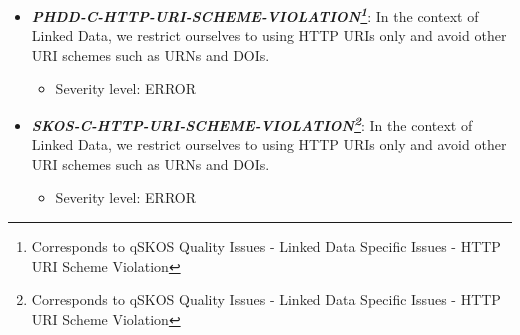 \documentclass{llncs}
\begin{document}
\begin{itemize}
	\item \textbf{\em PHDD-C-HTTP-URI-SCHEME-VIOLATION\footnote{Corresponds to qSKOS Quality Issues - Linked Data Specific Issues - HTTP URI Scheme Violation}}: 
	In the context of Linked Data, we restrict ourselves to using HTTP URIs only and avoid other URI schemes such as URNs and DOIs.
	\begin{itemize}
		\item Severity level: ERROR
	\end{itemize}
\end{itemize}

\begin{itemize}
	\item \textbf{\em SKOS-C-HTTP-URI-SCHEME-VIOLATION\footnote{Corresponds to qSKOS Quality Issues - Linked Data Specific Issues - HTTP URI Scheme Violation}}: 
	In the context of Linked Data, we restrict ourselves to using HTTP URIs only and avoid other URI schemes such as URNs and DOIs.
	\begin{itemize}
		\item Severity level: ERROR
	\end{itemize}
\end{itemize}

{}

\setcounter{tocdepth}{1}
\end{document}
